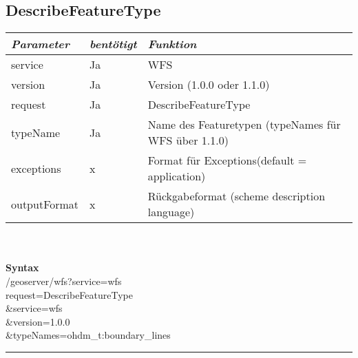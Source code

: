 \documentclass[12pt]{article}
\begin{document}
\subsection{DescribeFeatureType}
\begin{tabular}{lll}
\emph{Parameter} & \emph{bentötigt} & \emph{Funktion} \\
\hline
service	& Ja & 	 WFS\\
\hline
version	& Ja &	 Version (1.0.0 oder 1.1.0)\\
\hline
request	& Ja &	DescribeFeatureType\\
\hline
typeName	& Ja &	Name des Featuretypen (typeNames für WFS über 1.1.0)\\
\hline
exceptions	& x 	& Format für Exceptions(default = application)\\
\hline
outputFormat &	x	 &  Rückgabeformat (scheme description language)\\
\hline
\end{tabular}\\
\vspace{2em}\\
\textbf{Syntax}\\
/geoserver/wfs?service=wfs\\
request=DescribeFeatureType\\
\&service=wfs\\
\&version=1.0.0\\
\&typeNames=ohdm\_t:boundary\_lines\\

\hrule
\end{document}
